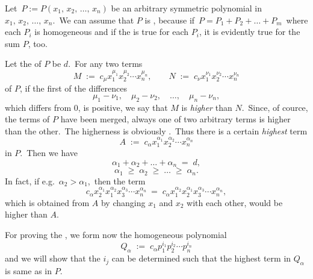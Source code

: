 \documentclass[12pt]{article}
\theoremstyle{definition}
\begin{document}

Let\, $P := P(x_1,\,x_2,\,\ldots,\,x_n)$ be an arbitrary symmetric polynomial in $x_1,\,x_2,\,\ldots,\,x_n$.\, We can assume that $P$ is , because if\, $P = P_1\!+\!P_2\!+\ldots+\!P_m$\, where each $P_i$ is homogeneous and if the  is true for each $P_i$, it is evidently true for the sum $P$, too.

Let the  of $P$ be $d$.\, For any two terms
$$M \;:=\; c_\mu x_1^{\mu_1}x_2^{\mu_2}\!\cdots\!x_n^{\mu_n}, 
\qquad  N \;:=\; c_\nu x_1^{\nu_1}x_2^{\nu_2}\!\cdots\!x_n^{\nu_n}$$
of $P$, if the first of the differences
$$\mu_1\!-\!\nu_1,\quad \mu_2\!-\!\nu_2,\quad \ldots,\quad 
\mu_n\!-\!\nu_n,$$
which differs from 0, is positive, we say that $M$ is \emph{higher} than $N$.\, Since, of cource, the  terms of $P$ have been merged, always one of two arbitrary terms is higher than the other.\, The higherness is obviously .\, Thus there is a certain \emph{highest} term 
$$A \;:=\; c_\alpha x_1^{\alpha_1}x_2^{\alpha_2}\!\cdots\!x_n^{\alpha_n}$$
in $P$.\, Then we have
$$\alpha_1\!+\!\alpha_2\!+\ldots+\!\alpha_n \;=\; d,$$
$$\alpha_1\;\ge\;\alpha_2\;\ge\;\ldots\;\ge\;\alpha_n.$$
In fact, if e.g.\, $\alpha_2 > \alpha_1$,\, then the term
$$c_\alpha x_2^{\alpha_1}x_1^{\alpha_2}x_3^{\alpha_3}\!\cdots\!x_n^{\alpha_n} \:=\; 
c_\alpha x_1^{\alpha_2}x_2^{\alpha_1}x_3^{\alpha_3}\!\cdots\!x_n^{\alpha_n},$$
which is obtained from $A$ by changing $x_1$ and $x_2$ with each other, would be higher than $A$. 

For proving the , we form now the homogeneous polynomial
$$Q_\alpha \;:=\; c_\alpha p_1^{i_1}p_2^{i_2}\!\cdots\!p_n^{i_n}$$
and we will show that the  $i_j$ can be determined such that the highest term in $Q_\alpha$ is same as in $P$.
\end{document}

